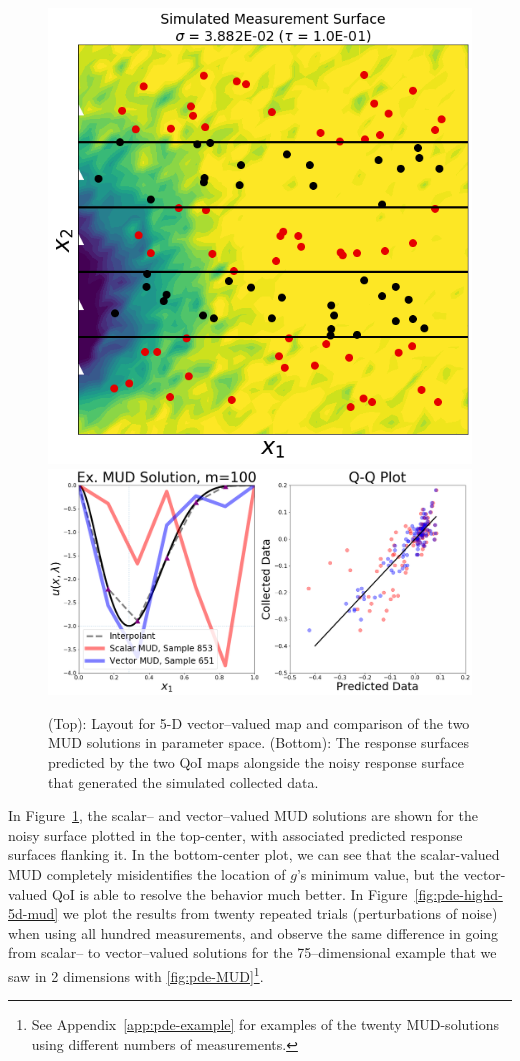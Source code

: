 \begin{figure}[htbp]
\centering
  \includegraphics[width=0.35\linewidth]{figures/pde-highd/pde-highd_sensors_D5}
  \includegraphics[width=0.6\linewidth]{figures/pde-highd/pde-highd_comp_exmud_D5_m100}
\caption{
(Top): Layout for 5-D vector--valued map and comparison of the two MUD solutions in parameter space.
(Bottom): The response surfaces predicted by the two QoI maps alongside the noisy response surface that generated the simulated collected data.
}
\label{fig:pde-highd-5d-example}
\end{figure}

In Figure~\ref{fig:pde-highd-5d-example}, the scalar-- and vector--valued MUD solutions are shown for the noisy surface plotted in the top-center, with associated predicted response surfaces flanking it.
In the bottom-center plot, we can see that the scalar-valued MUD completely misidentifies the location of $g$'s minimum value, but the vector-valued QoI is able to resolve the behavior much better.
In Figure~\ref{fig:pde-highd-5d-mud} we plot the results from twenty repeated trials (perturbations of noise) when using all hundred measurements, and observe the same difference in going from scalar-- to vector--valued solutions for the 75--dimensional example that we saw in 2 dimensions with \ref{fig:pde-MUD}\footnote{See Appendix~\ref{app:pde-example} for examples of the twenty MUD-solutions using different numbers of measurements.}.

